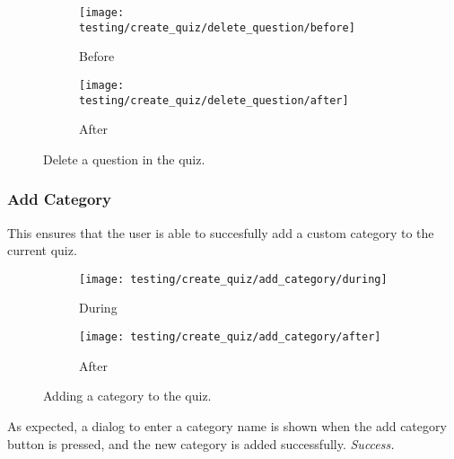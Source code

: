 \begin{figure}[!htbp]
\centering
\begin{subfigure}{0.5\textwidth}
  \centering
  \texttt{[image: testing/create\_quiz/delete\_question/before]}
  \caption{Before}
  \label{fig:sub1}
\end{subfigure}%
\begin{subfigure}{0.5\textwidth}
  \centering
  \texttt{[image: testing/create\_quiz/delete\_question/after]}
  \caption{After}
  \label{fig:sub2}
\end{subfigure}
\caption{Delete a question in the quiz.}
\label{fig:test}
\end{figure}

\subsubsection{Add Category} %
\label{ssub:add_question}
This ensures that the user is able to succesfully add a custom category to the current quiz.

\begin{figure}[!htbp]
\centering
\begin{subfigure}{0.5\textwidth}
  \centering
  \texttt{[image: testing/create\_quiz/add\_category/during]}
  \caption{During}
  \label{fig:sub1}
\end{subfigure}%
\begin{subfigure}{0.5\textwidth}
  \centering
  \texttt{[image: testing/create\_quiz/add\_category/after]}
  \caption{After}
  \label{fig:sub2}
\end{subfigure}
\caption{Adding a category to the quiz.}
\label{fig:test}

\end{figure}

As expected, a dialog to enter a category name is shown when the add category button is pressed, and the new category is added successfully. \textit{Success.}

